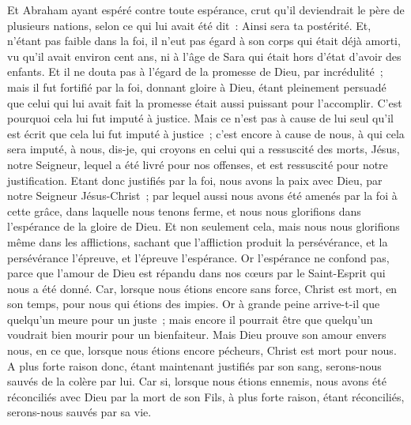 \begin{multicols}{2}
Et Abraham ayant espéré contre toute espérance, crut qu'il deviendrait le père de plusieurs nations, selon ce qui lui avait été dit~: Ainsi sera ta postérité.
Et, n'étant pas faible dans la foi, il n'eut pas égard à son corps qui était déjà amorti, vu qu'il avait environ cent ans, ni à l'âge de Sara qui était hors d'état d'avoir des enfants.
Et il ne douta pas à l'égard de la promesse de Dieu, par incrédulité~; mais il fut fortifié par la foi, donnant gloire à Dieu,
étant pleinement persuadé que celui qui lui avait fait la promesse était aussi puissant pour l'accomplir.
C'est pourquoi cela lui fut imputé à justice.
Mais ce n'est pas à cause de lui seul qu'il est écrit que cela lui fut imputé à justice~;
c'est encore à cause de nous, à qui cela sera imputé, à nous, dis-je, qui croyons en celui qui a ressuscité des morts, Jésus, notre Seigneur,
lequel a été livré pour nos offenses, et est ressuscité pour notre justification.
\VerseOne{}Etant donc justifiés par la foi, nous avons la paix avec Dieu, par notre Seigneur Jésus-Christ~;
par lequel aussi nous avons été amenés par la foi à cette grâce, dans laquelle nous tenons ferme, et nous nous glorifions dans l'espérance de la gloire de Dieu.
Et non seulement cela, mais nous nous glorifions même dans les afflictions, sachant que l'affliction produit la persévérance,
et la persévérance l'épreuve, et l'épreuve l'espérance.
Or l'espérance ne confond pas, parce que l'amour de Dieu est répandu dans nos cœurs par le Saint-Esprit qui nous a été donné.
Car, lorsque nous étions encore sans force, Christ est mort, en son temps, pour nous qui étions des impies.
Or à grande peine arrive-t-il que quelqu'un meure pour un juste~; mais encore il pourrait être que quelqu'un voudrait bien mourir pour un bienfaiteur.
Mais Dieu prouve son amour envers nous, en ce que, lorsque nous étions encore pécheurs, Christ est mort pour nous.
A plus forte raison donc, étant maintenant justifiés par son sang, serons-nous sauvés de la colère par lui.
Car si, lorsque nous étions ennemis, nous avons été réconciliés avec Dieu par la mort de son Fils, à plus forte raison, étant réconciliés, serons-nous sauvés par sa vie.

\end{multicols}
